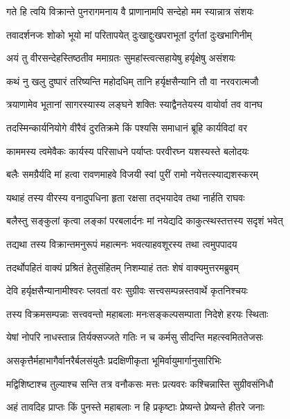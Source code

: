 \twolineshloka
{गते हि त्वयि विक्रान्ते पुनरागमनाय वै}
{प्राणानामपि सन्देहो मम स्यान्नात्र संशयः} %

\twolineshloka
{तवादर्शनजः शोको भूयो मां परितापयेत्}
{दुःखाद्दुःखपराभूतां दुर्गतां दुःखभागिनीम्} %

\twolineshloka
{अयं तु वीरसन्देहस्तिष्ठतीव ममाग्रतः}
{सुमहांस्त्वत्सहायेषु हर्यृक्षेषु असंशयः} %

\twolineshloka
{कथं नु खलु दुष्पारं तरिष्यन्ति महोदधिम्}
{तानि हर्यृक्षसैन्यानि तौ वा नरवरात्मजौ} %

\twolineshloka
{त्रयाणामेव भूतानां सागरस्यास्य लङ्घने}
{शक्तिः स्याद्वैनतेयस्य वायोर्वा तव वानघ} %

\twolineshloka
{तदस्मिन्कार्यनियोगे वीरैवं दुरतिक्रमे}
{किं पश्यसि समाधानं ब्रूहि कार्यविदां वर} %

\twolineshloka
{काममस्य त्वमेवैकः कार्यस्य परिसाधने}
{पर्याप्तः परवीरघ्न यशस्यस्ते बलोदयः} %

\twolineshloka
{बलैः समग्रैर्यदि मां हत्वा रावणमाहवे}
{विजयी स्वां पुरीं रामो नयेत्तत्स्याद्यशस्करम्} %

\twolineshloka
{यथाहं तस्य वीरस्य वनादुपधिना हृता}
{रक्षसा तद्भयादेव तथा नार्हति राघवः} %

\twolineshloka
{बलैस्तु सङ्कुलां कृत्वा लङ्कां परबलार्दनः}
{मां नयेद्यदि काकुत्स्थस्तत्तस्य सदृशं भवेत्} %

\twolineshloka
{तद्यथा तस्य विक्रान्तमनुरूपं महात्मनः}
{भवत्याहवशूरस्य तथा त्वमुपपादय} %

\twolineshloka
{तदर्थोपहितं वाक्यं प्रश्रितं हेतुसंहितम्}
{निशम्याहं ततः शेषं वाक्यमुत्तरमब्रुवम्} %

\twolineshloka
{देवि हर्यृक्षसैन्यानामीश्वरः प्लवतां वरः}
{सुग्रीवः सत्त्वसम्पन्नस्तवार्थे कृतनिश्चयः} %

\twolineshloka
{तस्य विक्रमसम्पन्नाः सत्त्ववन्तो महाबलाः}
{मनःसङ्कल्पसम्पाता निदेशे हरयः स्थिताः} %

\twolineshloka
{येषां नोपरि नाधस्तान्न तिर्यक्सज्जते गतिः}
{न च कर्मसु सीदन्ति महत्स्वमिततेजसः} %

\twolineshloka
{असकृत्तैर्महाभागैर्वानरैर्बलसंयुतैः}
{प्रदक्षिणीकृता भूमिर्वायुमार्गानुसारिभिः} %

\twolineshloka
{मद्विशिष्टाश्च तुल्याश्च सन्ति तत्र वनौकसः}
{मत्तः प्रत्यवरः कश्चिन्नास्ति सुग्रीवसंनिधौ} %

\twolineshloka
{अहं तावदिह प्राप्तः किं पुनस्ते महाबलाः}
{न हि प्रकृष्टाः प्रेष्यन्ते प्रेष्यन्ते हीतरे जनाः} %

